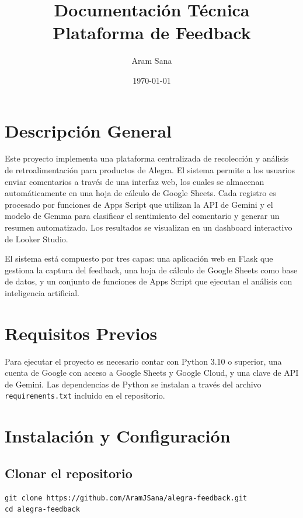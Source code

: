 \documentclass[12pt,a4paper]{article}
\title{
  \vspace{-1cm}
  {\large Documentación Técnica} \\[0.4em]
  {\LARGE \textbf{Plataforma de Feedback}}
}
\author{Aram Sana}
\date{\today}
\begin{document}
\maketitle
\thispagestyle{fancy}

\tableofcontents
\clearpage

\section{Descripción General}

Este proyecto implementa una plataforma centralizada de recolección y análisis de retroalimentación para productos de Alegra. El sistema permite a los usuarios enviar comentarios a través de una interfaz web, los cuales se almacenan automáticamente en una hoja de cálculo de Google Sheets. Cada registro es procesado por funciones de Apps Script que utilizan la API de Gemini y el modelo de Gemma para clasificar el sentimiento del comentario y generar un resumen automatizado. Los resultados se visualizan en un dashboard interactivo de Looker Studio.

El sistema está compuesto por tres capas: una aplicación web en Flask que gestiona la captura del feedback, una hoja de cálculo de Google Sheets como base de datos, y un conjunto de funciones de Apps Script que ejecutan el análisis con inteligencia artificial.

\section{Requisitos Previos}

Para ejecutar el proyecto es necesario contar con Python 3.10 o superior, una cuenta de Google con acceso a Google Sheets y Google Cloud, y una clave de API de Gemini. Las dependencias de Python se instalan a través del archivo \texttt{requirements.txt} incluido en el repositorio.

\section{Instalación y Configuración}

\subsection{Clonar el repositorio}

\begin{verbatim}
git clone https://github.com/AramJSana/alegra-feedback.git
cd alegra-feedback
\end{verbatim}
\end{document}

